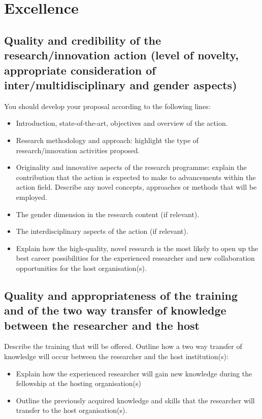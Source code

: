 \documentclass[a4paper,11pt]{article}
\begin{document}
\newpage

\section{Excellence}
\label{sec:excellence}

\subsection{Quality and credibility of the research/innovation action (level of novelty, appropriate consideration of inter/multidisciplinary and gender aspects) }
\label{sec:quality}

You should develop your proposal according to the following lines:
\begin{itemize}
\item Introduction, state-of-the-art, objectives and overview of the action.
\item Research methodology and approach: highlight the type of research/innovation activities proposed.
\item Originality and innovative aspects of the research programme: explain the contribution that the action is expected to make to advancements within the action field. Describe any novel concepts, approaches or methods that will be employed.
\item The gender dimension in the research content (if relevant).
\item The interdisciplinary aspects of the action (if relevant).
\item Explain how the high-quality, novel research is the most likely to open up the best career possibilities for the experienced researcher and new collaboration opportunities for the host organisation(s).
\end{itemize}

\subsection{Quality and appropriateness of the training and of the two way transfer of knowledge between the researcher and the host}
\label{sec:transfer}

Describe the training that will be offered. 
Outline how a two way transfer of knowledge will occur between the researcher and the host institution(s):
\begin{itemize}
\item Explain how the experienced researcher will gain new knowledge during the fellowship at the hosting organisation(s)
\item Outline the previously acquired knowledge and skills that the researcher will transfer to the host organisation(s).
\end{itemize}
\end{document}
